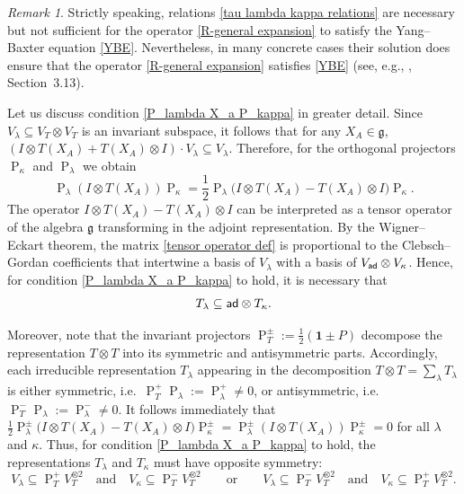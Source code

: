 \documentclass[a4paper]{article}
\newcommand{\ad}{{\sf ad}}
\renewcommand{\=}{\ =\ }
\DeclareMathOperator{\proj}{P}
\newcommand{\mfg}{\mathfrak{g}}
\numberwithin{equation}{section}
\theoremstyle{remark}
\newtheorem{remark}{Remark}
\begin{document}
\begin{remark}
Strictly speaking, relations \eqref{tau lambda kappa relations} are necessary but not sufficient for the operator \eqref{R-general expansion} to satisfy the Yang–Baxter equation \eqref{YBE}. Nevertheless, in many concrete cases their solution does ensure that the operator \eqref{R-general expansion} satisfies \eqref{YBE} (see, e.g., \cite{IsQGLect}, Section~3.13).
\end{remark}

Let us discuss condition \eqref{P_lambda X_a P_kappa} in greater detail. Since $V_\lambda\subseteq V_T\otimes V_T$ is an invariant subspace, it follows that for any $X_A\in\mfg$, $(I\otimes T(X_A)+T(X_A)\otimes I)\cdot V_\lambda\subseteq V_\lambda$. Therefore, for the orthogonal projectors $\proj_\kappa$ and $\proj_\lambda$ we obtain
\begin{equation}\label{tensor operator def}
\proj_\lambda(I\otimes T(X_A))\proj_\kappa
=\frac{1}{2}\proj_\lambda\big(I\otimes T(X_A)-T(X_A)\otimes I\big)\proj_\kappa.
\end{equation}
The operator $I\otimes T(X_A)-T(X_A)\otimes I$ can be interpreted as a tensor operator of the algebra $\mathfrak{g}$ transforming in the adjoint representation. By the Wigner–Eckart theorem, the matrix \eqref{tensor operator def} is proportional to the Clebsch–Gordan coefficients that intertwine a basis of $V_\lambda$ with a basis of $V_{\ad}\otimes V_\kappa$. Hence, for condition \eqref{P_lambda X_a P_kappa} to hold, it is necessary that
\begin{equation}\label{Wigner-Eckart}
T_\lambda\subseteq \ad\otimes T_\kappa.
\end{equation}

Moreover, note that the invariant projectors $\proj^{\pm}_{T}:=\frac{1}{2}(\mathbf{1}\pm P)$ decompose the representation $T\otimes T$ into its symmetric and antisymmetric parts. Accordingly, each irreducible representation $T_\lambda$ appearing in the decomposition $T\otimes T=\sum_\lambda T_\lambda$ is either symmetric, i.e.\ $\proj^+_{T}\proj_\lambda:=\proj^{+}_\lambda\neq 0$, or antisymmetric, i.e.\ $\proj^-_{T}\proj_\lambda:=\proj^{-}_\lambda\neq 0$. It follows immediately that $\frac{1}{2}\proj_\lambda^\pm\big(I\otimes T(X_A)-T(X_A)\otimes I\big)\proj_\kappa^\pm
=\proj_\lambda^\pm(I\otimes T(X_A))\proj_\kappa^\pm=0$ for all $\lambda$ and $\kappa$. Thus, for condition \eqref{P_lambda X_a P_kappa} to hold, the representations $T_\lambda$ and $T_\kappa$ must have opposite symmetry:
\begin{equation}\label{R-matrix_proj's_symmetry}
V_\lambda\subseteq \proj^+_T V_T^{\otimes 2}\quad \text{and}\quad
V_\kappa\subseteq \proj^-_T V_T^{\otimes 2}
\qquad \text{or}\qquad
V_\lambda\subseteq \proj^-_T V_T^{\otimes 2}\quad \text{and}\quad
V_\kappa\subseteq \proj^+_T V_T^{\otimes 2}.
\end{equation}
\end{document}
